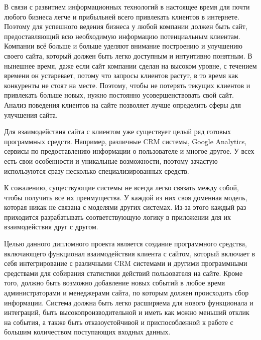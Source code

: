 \label{sec:intro}

В связи с развитием информационных технологий в настоящее время для почти любого бизнеса легче и прибыльней всего привлекать клиентов в интернете. Поэтому для успешного ведения бизнеса у любой компании должен быть сайт, предоставляющий всю необходимую информацию потенциальным клиентам. Компании всё больше и больше уделяют внимание построению и улучшению своего сайта, который должен быть легко доступным  и интуитивно понятным. В нынешнее время, даже если сайт компании сделан на высоком уровне, с течением времени он устаревает, потому что запросы клиентов растут, в то время как конкуренты не стоят на месте. Поэтому, чтобы не потерять текущих клиентов и привлекать больше новых, нужно постоянно усовершенствовать свой сайт. Анализ поведения клиентов на сайте позволяет лучше определить сферы для улучшения сайта.

Для взаимодействия сайта с клиентом уже существует целый ряд готовых программных средств. Например, различные CRM системы, Google Analytics, сервисы по предоставлению информации о пользователе и многое другое. У всех есть свои особенности и уникальные возможности, поэтому зачастую используются сразу несколько специализированных средств. 

К сожалению, существующие системы не всегда легко связать между собой, чтобы получить все их преимущества. У каждой из них своя доменная модель, которая никак не связана с моделями других системах. Из-за этого каждый раз приходится разрабатывать соответствующую логику в приложении для их взаимодействия друг с другом. 

Целью данного дипломного проекта является создание программного средства, включающего функционал взаимодействия клиента с сайтом, который включает в себя интегрирование с различными CRM системами и другими программными средствами для собирания статистики действий пользователя на сайте. Кроме того, должно быть возможно добавление новых  событий в любое время администраторами и менеджерами сайта, по которым должен происходить сбор информации. Система должна быть легко расширяема для нового функционала и интеграций, быть высокопроизводительной и иметь как можно меньший отклик на события, а также быть отказоустойчивой и приспособленной к работе с большим количеством поступающих входных данных.
